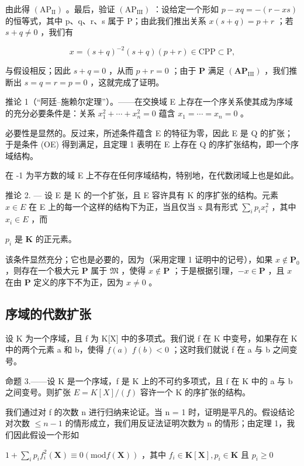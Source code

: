 由此得 \((\mathrm{AP}_{\mathrm{II}})\) 。最后，验证 \((\mathrm{AP}_{\mathrm{III}})\) ：设给定一个形如 \(p - xq = -(r - xs)\) 的恒等式，其中 p、q、r、s 属于 P；由此我们推出关系 \(x(s + q) = p + r\) ；若 \(s + q \neq 0\) ，我们有

\[
x = (s + q) ^ {- 2} (s + q) (p + r) \in \mathrm{CPP} \subset \mathrm{P},
\]

与假设相反；因此 \(s + q = 0\) ，从而 \(p + r = 0\) ；由于 \(\mathbf{P}\) 满足 \((\mathbf{AP}_{\mathrm{III}})\) ，我们推断出 \(s = q = r = p = 0\) ，这就完成了证明。

推论 1（“阿廷–施赖尔定理”）。——在交换域 E 上存在一个序关系使其成为序域的充分必要条件是：关系 \(x_{1}^{2} + \cdots + x_{n}^{2} = 0\) 蕴含 \(x_{1} = \cdots = x_{n} = 0\) 。

必要性是显然的。反过来，所述条件蕴含 E 的特征为零，因此 E 是 Q 的扩张；于是条件 (OE) 得到满足，且定理 1 表明在 E 上存在 Q 的序扩张结构，即一个序域结构。

在 -1 为平方数的域 E 上不存在任何序域结构，特别地，在代数闭域上也是如此。

推论 2. --- 设 E 是 K 的一个扩张，且 E 容许具有 K 的序扩张的结构。元素 \(x \in E\) 在 E 上的每一个这样的结构下为正，当且仅当 x 具有形式 \(\sum_{i} p_{i} x_{i}^{2}\) ，其中 \(x_{i} \in E\) ，而

\(p_i\) 是 \(\mathbf{K}\) 的正元素。

该条件显然充分；它也是必要的，因为（采用定理 1 证明中的记号），如果 \(x \notin \mathbf{P}_0\) ，则存在一个极大元 \(\mathbf{P}\) 属于 \(\mathfrak{M}\) ，使得 \(x \notin \mathbf{P}\) ；于是根据引理，\(-x \in \mathbf{P}\) ，且 \(x\) 在由 \(\mathbf{P}\) 定义的序下不为正，因为 \(x \neq 0\) 。

\subsection{序域的代数扩张}

设 K 为一个序域，且 f 为 K{[}X{]} 中的多项式。我们说 f 在 K 中变号，如果存在 K 中的两个元素 a 和 b，使得 \(f(a)\) \(f(b) < 0\) ；这时我们就说 f 在 a 与 b 之间变号。

命题 3.——设 K 是一个序域，f 是 K 上的不可约多项式，且 f 在 K 中的 a 与 b 之间变号。则扩张 \(E = K[X]/(f)\) 容许一个 K 的序扩张的结构。

我们通过对 f 的次数 n 进行归纳来论证。当 n = 1 时，证明是平凡的。假设结论对次数 \(\leqslant n - 1\) 的情形成立，我们用反证法证明次数为 n 的情形；由定理 1，我们因此假设一个形如

\(1 + \sum_{i}p_{i}f_{i}^{2}(\mathbf{X})\equiv 0 (\mathrm{mod} f(\mathbf{X}))\) ，其中 \(f_{i}\in \mathbf{K}[\mathbf{X}], p_{i}\in \mathbf{K}\) 且 \(p_i\geqslant 0\)

